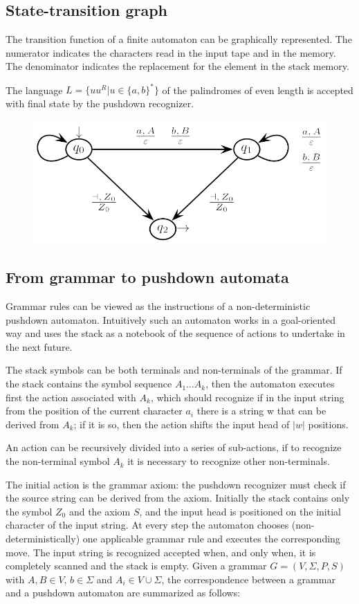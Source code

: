 \subsection*{State-transition graph}
The transition function of a finite automaton can be graphically represented.
The numerator indicates the characters read in the input tape and in the memory. 
The denominator indicates the replacement for the element in the stack memory. 
\begin{example}
    The language $L=\{uu^R|u \in \{a,b\}^{*}\}$ of the palindromes of even length is accepted with final state by the pushdown recognizer. 
    \begin{figure}[H]
        \centering
        \includegraphics[width=0.5\linewidth]{images/pda.png}
    \end{figure}
\end{example}

\subsection*{From grammar to pushdown automata}
Grammar rules can be viewed as the instructions of a non-deterministic pushdown automaton. 
Intuitively such an automaton works in a goal-oriented way and uses the stack as a notebook of the sequence of actions to undertake in the next future. 

The stack symbols can be both terminals and non-terminals of the grammar. 
If the stack contains the symbol sequence $A_1 \dots A_k$, then the automaton executes first the action associated with $A_k$, which should recognize if in the input string from the position of the current character $a_i$ there is a string w that can be derived from $A_k$; if it is so, then the action shifts the input head of $\left\lvert w\right\rvert $ positions. 

An action can be recursively divided into a series of sub-actions, if to recognize the non-terminal symbol $A_k$ it is necessary to recognize other non-terminals. 

The initial action is the grammar axiom: the pushdown recognizer must check if the source string can be derived from the axiom. 
Initially the stack contains only the symbol $Z_0$ and the axiom $S$, and the input head is positioned on the initial character of the input string. At every step the automaton chooses (non-deterministically) one applicable grammar rule and executes the corresponding move. 
The input string is recognized accepted when, and only when, it is completely scanned and the stack is empty. 
Given a grammar $G=(V,\Sigma,P,S)$ with $A,B \in V$, $b \in \Sigma$ and $A_i \in V \cup \Sigma$, the correspondence between a grammar and a pushdown automaton are summarized as follows: 

